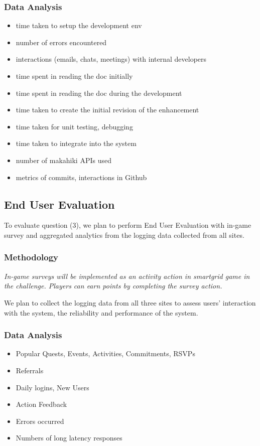 \documentclass[11pt]{article}
\begin{document}
\subsubsection{Data Analysis}
\begin{itemize}
 \item time taken to setup the development env
 \item number of errors encountered
 \item interactions (emails, chats, meetings) with internal developers
 \item time spent in reading the doc initially
 \item time spent in reading the doc during the development
 \item time taken to create the initial revision of the enhancement
 \item time taken for unit testing, debugging
 \item time taken to integrate into the system
 \item number of makahiki APIs used
 \item metrics of commits, interactions in Github
 
\end{itemize}

\subsection{End User Evaluation}
To evaluate question (3), we plan to perform End User Evaluation with in-game survey and aggregated analytics from the logging data collected from all sites.

\subsubsection{Methodology}

\em In-game surveys \em will be implemented as an activity action in smartgrid game in the challenge. Players can earn points by completing the survey action. 

We plan to collect the logging data from all three sites to assess users' interaction with the system, the reliability and performance of the system.

\subsubsection{Data Analysis}
\begin{itemize}
 \item Popular Quests, Events, Activities, Commitments, RSVPs
 \item Referrals
 \item Daily logins, New Users
 \item Action Feedback
 \item Errors occurred
 \item Numbers of long latency responses
\end{itemize}
\end{document}

